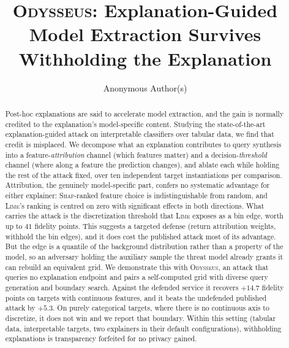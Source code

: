 \documentclass[sigconf,anonymous,review]{acmart}
\newcommand{\sys}{\textsc{Odysseus}}
\newcommand{\TODO}[1]{\textcolor{red}{[TODO: #1]}}
\begin{document}
\title[\sys]{\sys: Explanation-Guided Model Extraction
Survives Withholding the Explanation}

\author{Anonymous Author(s)}
\email{}
\renewcommand{\shortauthors}{Anonymous}

\begin{abstract}
Post-hoc explanations are said to accelerate model extraction, and the gain is normally credited to
the explanation's model-specific content. Studying the state-of-the-art explanation-guided attack on
interpretable classifiers over tabular data, we find that credit is misplaced. We decompose what an
explanation contributes to query synthesis into a feature-\emph{attribution} channel (which features
matter) and a decision-\emph{threshold} channel (where along a feature the prediction changes), and
ablate each while holding the rest of the attack fixed, over ten independent target instantiations per
comparison. Attribution, the genuinely model-specific part, confers no systematic advantage for
either explainer: \textsc{Shap}-ranked feature choice is indistinguishable from random, and
\textsc{Lime}'s ranking is centred on zero with significant effects in both directions. What carries
the attack is the discretization threshold that \textsc{Lime} exposes as a bin edge, worth up to $41$
fidelity points. This suggests a targeted defense (return attribution weights, withhold the bin edges), and it does cost the published attack most of its advantage. But the edge is a quantile of the
background distribution rather than a property of the model, so an adversary holding the auxiliary
sample the threat model already grants it can rebuild an equivalent grid. We demonstrate this with
\sys, an attack that queries no explanation endpoint and pairs a self-computed grid with diverse query
generation and boundary search. Against the defended service it recovers $+14.7$ fidelity points on
targets with continuous features, and it beats the undefended published attack by $+5.3$. On purely categorical targets, where there is no continuous axis to discretize, it does not win and we report
that boundary. Within this setting (tabular data, interpretable targets, two explainers in their default configurations), withholding explanations is transparency forfeited for no privacy gained.
\end{abstract}
\end{document}
